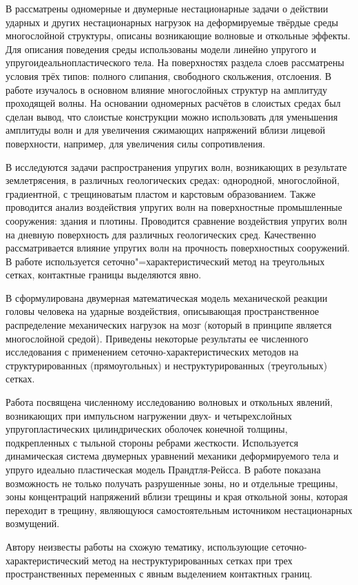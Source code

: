 В \cite{petrov_tormasov_holodov} рассматрены одномерные и двумерные нестационарные задачи о действии ударных и других нестационарных нагрузок на деформируемые твёрдые среды многослойной структуры, описаны возникающие волновые и откольные эффекты. Для описания поведения среды использованы модели линейно упругого и упругоидеальнопластического тела. На поверхностях раздела слоев рассматрены условия трёх типов: полного слипания, свободного скольжения, отслоения. В работе изучалось в основном влияние многослойных структур на амплитуду проходящей волны. На основании одномерных расчётов в слоистых средах был сделан вывод, что слоистые конструкции можно использовать для уменьшения амплитуды волн и для увеличения сжимающих напряжений вблизи лицевой поверхности, например, для увеличения силы сопротивления.

В \cite{golubev_kvasov_petrov} исследуются задачи распространения упругих волн, возникающих в результате землетрясения, в различных геологических средах: однородной, многослойной, градиентной, с трещиноватым пластом и карстовым образованием. Также проводится анализ воздействия упругих волн на поверхностные промышленные сооружения: здания и плотины. Проводится сравнение воздействия упругих волн на дневную поверхность для различных геологических сред. Качественно рассматривается влияние упругих волн на прочность поверхностных сооружений. В работе используется сеточно"=характеристический метод на треугольных сетках, контактные границы выделяются явно.

В \cite{agapov_belocerkovsky_petrov} сформулирована двумерная математическая модель механической реакции головы человека на ударные воздействия, описывающая пространственное распределение механических нагрузок на мозг (который в принципе является многослойной средой). Приведены некоторые результаты ее численного исследования с применением сеточно-характеристических методов на структурированных (прямоугольных) и неструктурированных (треугольных) сетках.

Работа \cite{petrov} посвящена численному исследованию волновых и откольных явлений, возникающих при импульсном нагружении двух- и четырехслойных упругопластических цилиндрических оболочек конечной толщины, подкрепленных с тыльной стороны ребрами жесткости. Используется динамическая система двумерных уравнений механики деформируемого тела и упруго идеально пластическая модель Прандтля-Рейсса. В работе показана возможность не только получать разрушенные зоны, но и отдельные трещины, зоны концентраций напряжений вблизи трещины и края откольной зоны, которая переходит в трещину, являющуюся самостоятельным источником нестационарных возмущений.

Автору неизвесты работы на схожую тематику, использующие сеточно-характеристический метод на неструктурированных сетках при трех пространственных переменных с явным выделением контактных границ.

